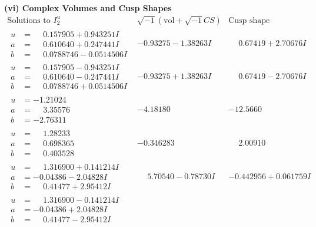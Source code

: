 \documentclass[1p]{elsarticle_modified}
\theoremstyle{definition}
\newcommand{\I}{\sqrt{-1}}
\begin{document}
\newpage\flushleft \textbf{(vi) Complex Volumes and Cusp Shapes}
$$\begin{array}{c|c|c}  
\text{Solutions to }I^u_{2}& \I (\text{vol} + \sqrt{-1}CS) & \text{Cusp shape}\\
 \hline 
\begin{aligned}
u &= \phantom{-}0.157905 + 0.943251 I \\
a &= \phantom{-}0.610640 + 0.247441 I \\
b &= \phantom{-}0.0788746 - 0.0514506 I\end{aligned}
 & -0.93275 - 1.38263 I & \phantom{-}0.67419 + 2.70676 I \\ \hline\begin{aligned}
u &= \phantom{-}0.157905 - 0.943251 I \\
a &= \phantom{-}0.610640 - 0.247441 I \\
b &= \phantom{-}0.0788746 + 0.0514506 I\end{aligned}
 & -0.93275 + 1.38263 I & \phantom{-}0.67419 - 2.70676 I \\ \hline\begin{aligned}
u &= -1.21024\phantom{ +0.000000I} \\
a &= \phantom{-}3.35576\phantom{ +0.000000I} \\
b &= -2.76311\phantom{ +0.000000I}\end{aligned}
 & -4.18180\phantom{ +0.000000I} & -12.5660\phantom{ +0.000000I} \\ \hline\begin{aligned}
u &= \phantom{-}1.28233\phantom{ +0.000000I} \\
a &= \phantom{-}0.698365\phantom{ +0.000000I} \\
b &= \phantom{-}0.403528\phantom{ +0.000000I}\end{aligned}
 & -0.346283\phantom{ +0.000000I} & \phantom{-}2.00910\phantom{ +0.000000I} \\ \hline\begin{aligned}
u &= \phantom{-}1.316900 + 0.141214 I \\
a &= -0.04386 - 2.04828 I \\
b &= \phantom{-}0.41477 + 2.95412 I\end{aligned}
 & \phantom{-}5.70540 - 0.78730 I & -0.442956 + 0.061759 I \\ \hline\begin{aligned}
u &= \phantom{-}1.316900 - 0.141214 I \\
a &= -0.04386 + 2.04828 I \\
b &= \phantom{-}0.41477 - 2.95412 I\end{aligned}

\end{array}$$
\end{document}
